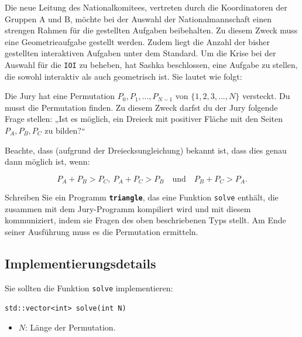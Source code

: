 \documentclass[12pt]{article}
\begin{document}
\renewcommand{\headerLang}{German}
\renewcommand{\problemName}{AB23. TRIANGLE}

\renewcommand{\headerLeft}{IATI Day 2, Senior group}
\renewcommand{\headerRightFirst}{XVII INTERNATIONAL ADVANCED TOURNAMENT IN INFORMATICS}
\renewcommand{\headerRightSecond}{ONLINE 2026}

\renewcommand{\tl}{$10$ sec.}
\renewcommand{\ml}{$1024$ MB}
\problem{Problem \problemName}


Die neue Leitung des Nationalkomitees, vertreten durch die Koordinatoren der Gruppen A und B, möchte bei der Auswahl der Nationalmannschaft einen strengen Rahmen für die gestellten Aufgaben beibehalten. Zu diesem Zweck muss eine Geometrieaufgabe gestellt werden. Zudem liegt die Anzahl der bisher gestellten interaktiven Aufgaben unter dem Standard. Um die Krise bei der Auswahl für die \texttt{IOI} zu beheben, hat Sashka beschlossen, eine Aufgabe zu stellen, die sowohl interaktiv als auch geometrisch ist. Sie lautet wie folgt:

Die Jury hat eine Permutation $P_0,P_1,...,P_{N-1}$ von $\{1,2,3,...,N\}$ versteckt. Du musst die Permutation finden. Zu diesem Zweck darfst du der Jury folgende Frage stellen: „Ist es möglich, ein Dreieck mit positiver Fläche mit den Seiten $P_A,P_B,P_C$ zu bilden?“

Beachte, dass (aufgrund der Dreiecksungleichung) bekannt ist, dass dies genau dann möglich ist, wenn:

\[P_A + P_B > P_C,\ P_A + P_C > P_B \quad \text{und} \quad P_B + P_C > P_A.\]

Schreiben Sie ein Programm \textbf{\texttt{triangle}}, das eine Funktion \texttt{solve} enthält, die zusammen mit dem Jury-Programm kompiliert wird und mit diesem kommuniziert, indem sie Fragen des oben beschriebenen Typs stellt. Am Ende seiner Ausführung muss es die Permutation ermitteln.

\subsection{Implementierungsdetails}
Sie sollten die Funktion \texttt{solve} implementieren:
\begin{lstlisting}
std::vector<int> solve(int N)
\end{lstlisting}
\begin{itemize}
    \item $N$: Länge der Permutation.
\end{itemize}
\end{document}
